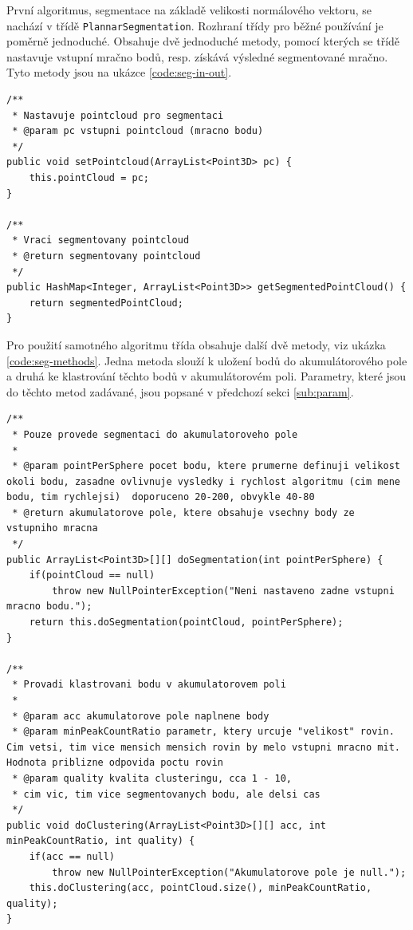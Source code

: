 \documentclass[11pt,twoside,a4paper]{book}
\begin{document}
První algoritmus, segmentace na základě velikosti normálového vektoru, se nachází v třídě \verb|PlannarSegmentation|. Rozhraní třídy pro běžné používání je poměrně jednoduché. Obsahuje dvě jednoduché metody, pomocí kterých se třídě nastavuje vstupní mračno bodů, resp. získává výsledné segmentované mračno. Tyto metody jsou na ukázce \ref{code:seg-in-out}.

\begin{lstlisting}[label=code:seg-in-out,caption={Metody pro nastavení vstupu a získání výstup algoritmu.}]
/**
 * Nastavuje pointcloud pro segmentaci
 * @param pc vstupni pointcloud (mracno bodu)
 */
public void setPointcloud(ArrayList<Point3D> pc) {
	this.pointCloud = pc;
}

/**
 * Vraci segmentovany pointcloud
 * @return segmentovany pointcloud
 */
public HashMap<Integer, ArrayList<Point3D>> getSegmentedPointCloud() {
	return segmentedPointCloud;
}
\end{lstlisting}

Pro použití samotného algoritmu třída obsahuje další dvě metody, viz ukázka \ref{code:seg-methods}. Jedna metoda slouží k uložení bodů do akumulátorového pole a druhá ke klastrování těchto bodů v akumulátorovém poli. Parametry, které jsou do těchto metod zadávané, jsou popsané v předchozí sekci \ref{sub:param}.

\begin{lstlisting}[label={code:seg-methods},caption={Metody určené pro používání algoritmu.}]
/**
 * Pouze provede segmentaci do akumulatoroveho pole
 * 
 * @param pointPerSphere pocet bodu, ktere prumerne definuji velikost okoli bodu, zasadne ovlivnuje vysledky i rychlost algoritmu (cim mene bodu, tim rychlejsi)  doporuceno 20-200, obvykle 40-80
 * @return akumulatorove pole, ktere obsahuje vsechny body ze vstupniho mracna
 */
public ArrayList<Point3D>[][] doSegmentation(int pointPerSphere) {
	if(pointCloud == null)
	    throw new NullPointerException("Neni nastaveno zadne vstupni mracno bodu.");
	return this.doSegmentation(pointCloud, pointPerSphere);
}

/**
 * Provadi klastrovani bodu v akumulatorovem poli
 * 
 * @param acc akumulatorove pole naplnene body
 * @param minPeakCountRatio parametr, ktery urcuje "velikost" rovin. Cim vetsi, tim vice mensich mensich rovin by melo vstupni mracno mit. Hodnota priblizne odpovida poctu rovin
 * @param quality kvalita clusteringu, cca 1 - 10,
 * cim vic, tim vice segmentovanych bodu, ale delsi cas
 */
public void doClustering(ArrayList<Point3D>[][] acc, int minPeakCountRatio, int quality) {
	if(acc == null)
	    throw new NullPointerException("Akumulatorove pole je null.");
	this.doClustering(acc, pointCloud.size(), minPeakCountRatio, quality);
}
\end{lstlisting}
\end{document}
